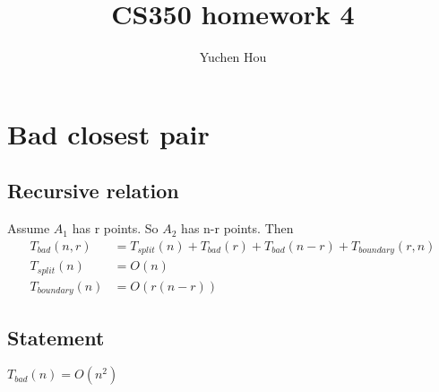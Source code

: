 \documentclass{article}
\begin{document}
\lstset{language=Java}
\title{CS350 homework 4}
\author{Yuchen Hou}
\maketitle

\section{Bad closest pair}
\subsection{Recursive relation}
Assume $A_1$ has r points. So $A_2$ has n-r points. Then
\begin{align*}
T_{bad}(n,r) &= T_{split}(n) + T_{bad}(r) + T_{bad}(n-r) + T_{boundary}(r, n)\\
T_{split}(n) &= O(n)\\
T_{boundary}(n) &= O(r(n-r))
\end{align*}
\subsection{Statement}
$T_{bad}(n) = O(n^2)$
\end{document}
